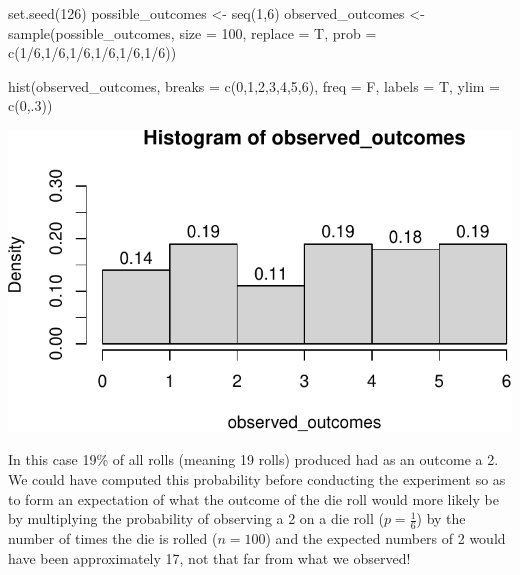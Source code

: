 \documentclass[
  letterpaper,
  DIV=11,
  numbers=noendperiod]{scrartcl}
\newenvironment{Shaded}{\begin{snugshade}}{\end{snugshade}}
\newcommand{\AttributeTok}[1]{\textcolor[rgb]{0.40,0.45,0.13}{#1}}
\newcommand{\DecValTok}[1]{\textcolor[rgb]{0.68,0.00,0.00}{#1}}
\newcommand{\FunctionTok}[1]{\textcolor[rgb]{0.28,0.35,0.67}{#1}}
\newcommand{\NormalTok}[1]{\textcolor[rgb]{0.00,0.23,0.31}{#1}}
\newcommand{\OtherTok}[1]{\textcolor[rgb]{0.00,0.23,0.31}{#1}}
\newcommand{\SpecialCharTok}[1]{\textcolor[rgb]{0.37,0.37,0.37}{#1}}
\begin{document}
\begin{Shaded}
\begin{Highlighting}[]
\FunctionTok{set.seed}\NormalTok{(}\DecValTok{126}\NormalTok{)}
\NormalTok{possible\_outcomes }\OtherTok{\textless{}{-}} \FunctionTok{seq}\NormalTok{(}\DecValTok{1}\NormalTok{,}\DecValTok{6}\NormalTok{)}
\NormalTok{observed\_outcomes }\OtherTok{\textless{}{-}} \FunctionTok{sample}\NormalTok{(possible\_outcomes, }\AttributeTok{size =} \DecValTok{100}\NormalTok{, }
                            \AttributeTok{replace =}\NormalTok{ T, }\AttributeTok{prob =} \FunctionTok{c}\NormalTok{(}\DecValTok{1}\SpecialCharTok{/}\DecValTok{6}\NormalTok{,}\DecValTok{1}\SpecialCharTok{/}\DecValTok{6}\NormalTok{,}\DecValTok{1}\SpecialCharTok{/}\DecValTok{6}\NormalTok{,}\DecValTok{1}\SpecialCharTok{/}\DecValTok{6}\NormalTok{,}\DecValTok{1}\SpecialCharTok{/}\DecValTok{6}\NormalTok{,}\DecValTok{1}\SpecialCharTok{/}\DecValTok{6}\NormalTok{))}

\FunctionTok{hist}\NormalTok{(observed\_outcomes, }\AttributeTok{breaks =} \FunctionTok{c}\NormalTok{(}\DecValTok{0}\NormalTok{,}\DecValTok{1}\NormalTok{,}\DecValTok{2}\NormalTok{,}\DecValTok{3}\NormalTok{,}\DecValTok{4}\NormalTok{,}\DecValTok{5}\NormalTok{,}\DecValTok{6}\NormalTok{), }\AttributeTok{freq =}\NormalTok{ F, }
     \AttributeTok{labels =}\NormalTok{ T, }\AttributeTok{ylim =} \FunctionTok{c}\NormalTok{(}\DecValTok{0}\NormalTok{,.}\DecValTok{3}\NormalTok{))}
\end{Highlighting}
\end{Shaded}

\begin{center}
\includegraphics{stats_review_files/figure-pdf/unnamed-chunk-17-1.pdf}
\end{center}

In this case 19\% of all rolls (meaning 19 rolls) produced had as an
outcome a 2. We could have computed this probability before conducting
the experiment so as to form an expectation of what the outcome of the
die roll would more likely be by multiplying the probability of
observing a 2 on a die roll (\(p=\frac{1}{6}\)) by the number of times
the die is rolled (\(n=100\)) and the expected numbers of 2 would have
been approximately 17, not that far from what we observed!
\end{document}
